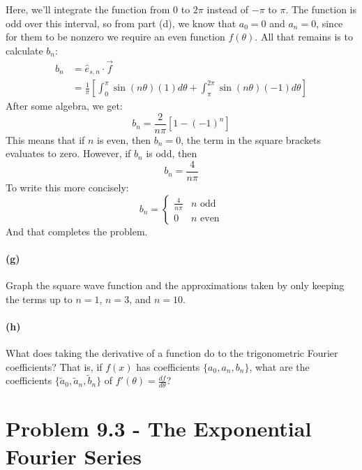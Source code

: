 \documentclass{article}
\begin{document}
\begin{solution}
	Here, we'll integrate the function from $0$ to $2\pi$ instead of $-\pi$ to $\pi$. The function 
	is odd over this interval, so from part (d), we know that $a_0 = 0$ and $a_n = 0$, since for them 
	to be nonzero we require an even function $f(\theta)$. All that remains is to calculate $b_n$:
	\begin{align*}
		b_n &= \hat{e}_{s, n} \cdot \vec f\\
			&= \frac{1}{\pi}\left[ \int_0^\pi \sin(n \theta) (1) d\theta + \int_\pi^{2\pi} \sin(n \theta) (-1) d\theta\right]
	\end{align*} 
	After some algebra, we get:
	\[
		b_n = \frac{2}{n\pi}\left[ 1 - (-1)^n\right]
	\] 
	This means that if $n$ is even, then $b_n = 0$, the term in the square brackets evaluates to zero. However, 
	if $b_n$ is odd, then
	\[
	b_n = \frac{4}{n\pi}
	\] 
	To write this more concisely:
		\[
	b_n = \begin{cases}
		\frac{4}{n\pi} & \text{$n$ odd}\\
		0 & \text{$n$ even}
	\end{cases}
	\]
	And that completes the problem.
\end{solution}

\paragraph{(g)}		\extrapart
Graph the square wave function and the approximations taken by only keeping the terms up to $n=1$, $n=3$, and $n=10$.


\paragraph{(h)}		\extrapart
What does taking the derivative of a function do to the trigonometric Fourier coefficients?  That is, if $f(x)$ has coefficients $\{a_{0},a_{n},b_{n}\}$, what are the coefficients
$\{\tilde{a}_{0},\tilde{a}_{n},\tilde{b}_{n}\}$ of $f'(\theta) = \frac{df}{d\theta}$?

\bigskip
\dphline
\pagebreak
\section*{Problem 9.3 - The Exponential Fourier Series}
\end{document}
